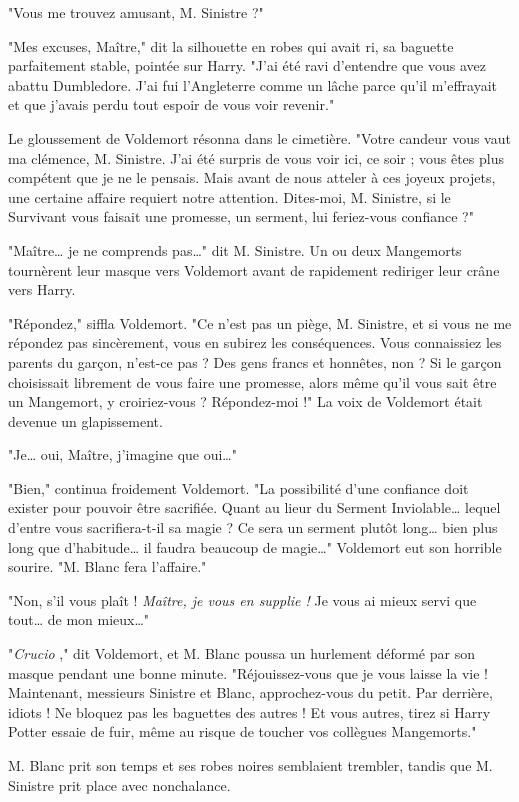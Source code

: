 "Vous me trouvez amusant, M. Sinistre ?"

"Mes excuses, Maître," dit la silhouette en robes qui avait ri, sa baguette parfaitement stable, pointée sur Harry. "J'ai été ravi d'entendre que vous avez abattu Dumbledore. J'ai fui l'Angleterre comme un lâche parce qu'il m'effrayait et que j'avais perdu tout espoir de vous voir revenir."

Le gloussement de Voldemort résonna dans le cimetière. "Votre candeur vous vaut ma clémence, M. Sinistre. J'ai été surpris de vous voir ici, ce soir ; vous êtes plus compétent que je ne le pensais. Mais avant de nous atteler à ces joyeux projets, une certaine affaire requiert notre attention. Dites-moi, M. Sinistre, si le Survivant vous faisait une promesse, un serment, lui feriez-vous confiance ?"

"Maître… je ne comprends pas…" dit M. Sinistre. Un ou deux Mangemorts tournèrent leur masque vers Voldemort avant de rapidement rediriger leur crâne vers Harry.

"Répondez," siffla Voldemort. "Ce n'est pas un piège, M. Sinistre, et si vous ne me répondez pas sincèrement, vous en subirez les conséquences. Vous connaissiez les parents du garçon, n'est-ce pas ? Des gens francs et honnêtes, non ? Si le garçon choisissait librement de vous faire une promesse, alors même qu'il vous sait être un Mangemort, y croiriez-vous ? Répondez-moi !" La voix de Voldemort était devenue un glapissement.

"Je… oui, Maître, j'imagine que oui…"

"Bien," continua froidement Voldemort. "La possibilité d'une confiance doit exister pour pouvoir être sacrifiée. Quant au lieur du Serment Inviolable… lequel d'entre vous sacrifiera-t-il sa magie ? Ce sera un serment plutôt long… bien plus long que d'habitude… il faudra beaucoup de magie…" Voldemort eut son horrible sourire. "M. Blanc fera l'affaire."

"Non, s'il vous plaît ! \emph{Maître, je vous en supplie !}  Je vous ai mieux servi que tout… de mon mieux…"

"\emph{Crucio} ," dit Voldemort, et M. Blanc poussa un hurlement déformé par son masque pendant une bonne minute. "Réjouissez-vous que je vous laisse la vie ! Maintenant, messieurs Sinistre et Blanc, approchez-vous du petit. Par derrière, idiots ! Ne bloquez pas les baguettes des autres ! Et vous autres, tirez si Harry Potter essaie de fuir, même au risque de toucher vos collègues Mangemorts."

M. Blanc prit son temps et ses robes noires semblaient trembler, tandis que M. Sinistre prit place avec nonchalance.

